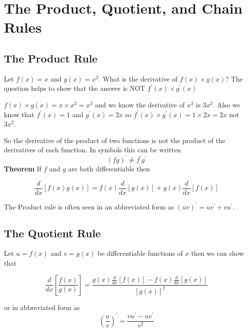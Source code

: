 \section{The Product, Quotient, and Chain Rules}

\subsection*{The Product Rule}
Let $f (x) =x$ and $g (x) =x^{2}$. What is the derivative of $f (x) \times g (x)$? The question helps to show that the answer is NOT $f^{ \prime } (x) \times g^{ \prime } (x)$ 

$f (x) \times g (x) =x \times x^{2} =x^{3}$ and we know the derivative of $x^{3}$ is $3 x^{2}$. Also we know that $f^{ \prime } (x) =1$ and $g^{ \prime } (x) =2 x$ so $f^{ \prime } (x) \times g^{ \prime } (x) =1 \times 2 x =2 x$ not $3 x^{2}$. 

So the derivative of the product of two functions is not the product of the derivatives of each function. In symbols this can be written 
\[\left (f g\right )^{ \prime } \neq f^{ \prime } g^{ \prime }\]
\textbf{Theorem} If $f$ and $g$ are both differentiable then 
\begin{tcolorbox}
	\[\frac{d}{d x} \left [f (x) g (x)\right ] =f (x) \frac{d}{d x} \left [g (x)\right ] +g (x) \frac{d}{d x} \left [f (x)\right ]\]
	\end{tcolorbox}
The Product rule is often seen in an abbreviated form as $\displaystyle \left(u v\right)^{\prime} =uv^{\prime} +vu^{\prime}$.

\subsection*{The Quotient Rule}
Let $u =f (x)$ and $v =g (x)$ be differentiable functions of $x$ then we can show that
\begin{tcolorbox}
	\[\frac{d}{d x} \genfrac{[}{]}{}{}{f (x)}{g (x)} =\frac{g (x) \frac{d}{d x} \left [f (x)\right ] -f (x) \frac{d}{d x} \left [g (x)\right ]}{\left [g (x)\right ]^{2}}
\]
\end{tcolorbox}
or in abbreviated form as
\begin{equation*}\genfrac{(}{)}{}{}{u}{v}^{ \prime } =\frac{v u^{ \prime } -u v^{ \prime }}{v^{2}}
\end{equation*}

